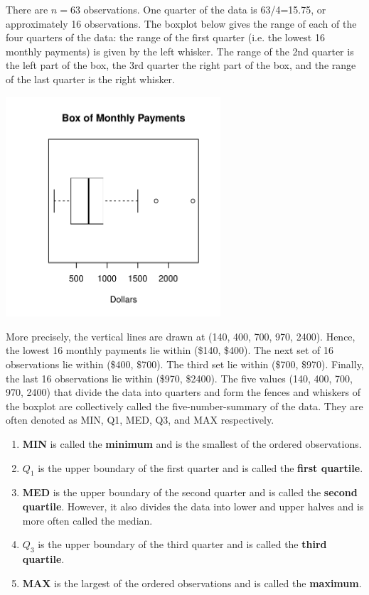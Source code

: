\documentclass[11pt, chapterprefix=true]{scrbook}\usepackage[]{graphicx}\usepackage[]{color}
\begin{document}
There are $n = 63$ observations.  One quarter of the data is 63/4=15.75, or approximately 16 observations.  The boxplot below gives the range of each of the four quarters of the data: the range of the first quarter (i.e. the lowest 16 monthly payments) is given by the left whisker.  The range of the 2nd quarter is the left part of the box, the 3rd quarter the right part of the box, and the range of the last quarter is the right whisker.



{\centering \includegraphics[width=8cm]{figure/LBL2g-1} 

}




More precisely, the vertical lines are drawn at (140, 400, 700, 970, 2400).  Hence, the lowest 16 monthly payments lie within (\$140, \$400).  The next set of 16 observations lie within (\$400, \$700).  The third set lie within (\$700, \$970).  Finally, the last 16 observations lie within (\$970, \$2400).  The five values (140, 400, 700, 970, 2400) that divide the data into quarters and form the fences and whiskers of the boxplot are collectively called the five-number-summary of the data.  They are often denoted as MIN, Q1, MED, Q3, and MAX respectively.

\begin{enumerate}
\item	\textbf{MIN} is called the \textbf{minimum} and is the smallest of the ordered observations.
\item	\textbf{$Q_1$} is the upper boundary of the first quarter and is called the \textbf{first quartile}.
\item	\textbf{MED} is the upper boundary of the second quarter and is called the \textbf{second quartile}.  However, it also divides the data into lower and upper halves and is more often called the median.
\item	\textbf{$Q_3$} is the upper boundary of the third quarter and is called the \textbf{third quartile}.
\item	\textbf{MAX} is the largest of the ordered observations and is called the \textbf{maximum}.
\end{enumerate}
\end{document}
